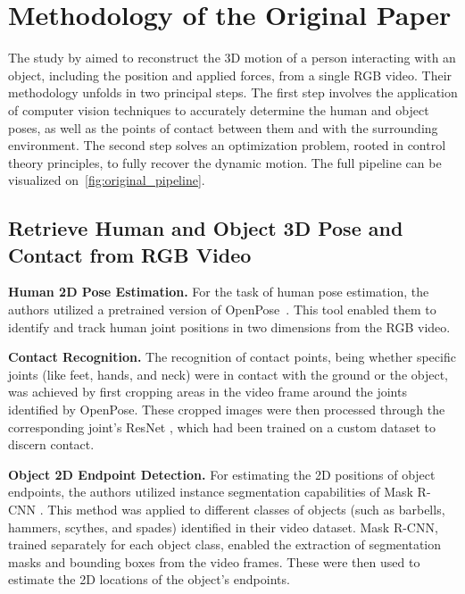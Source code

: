 \section{Methodology of the Original Paper}
\label{sec:methodo_paper}

The study by \citet{li2019estimating} aimed to reconstruct the 3D motion of a person interacting with an object, including the position 
and applied forces, from a single RGB video. Their methodology unfolds in two principal steps. The first step involves the application of 
computer vision techniques to accurately determine the human and object poses, as well as the points of contact between them and with the 
surrounding environment. The second step solves an optimization problem, rooted in control theory principles, to fully recover 
the dynamic motion. The full pipeline can be visualized on~\cref{fig:original_pipeline}.

\begin{figure*}
    \centering
    \fbox{\rule{0pt}{2in} \rule{.9\linewidth}{0pt}}
    \caption{Full original pipeline.}
    \label{fig:original_pipeline}
\end{figure*}


\subsection{Retrieve Human and Object 3D Pose and Contact from RGB Video}
\label{subsec:retrieve_original}

\noindent\textbf{Human 2D Pose Estimation.}\label{2dpose} For the task of human pose estimation, the authors utilized a pretrained version of 
OpenPose~\cite{cao2017realtime}. This tool enabled them to identify and track human joint positions in two dimensions from the RGB video.

\noindent\textbf{Contact Recognition.} The recognition of contact points, being whether specific joints (like feet, hands, and neck) were in 
contact with the ground or the object, was achieved by first cropping areas in the video frame around the joints identified by OpenPose. 
These cropped images were then processed through the corresponding joint's ResNet \cite{he2016deep}, which had been trained on a custom dataset 
to discern contact.

\noindent\textbf{Object 2D Endpoint Detection.} For estimating the 2D positions of object endpoints, the authors utilized instance segmentation 
capabilities of Mask R-CNN \cite{he2017mask}. This method was applied to different classes of objects (such as barbells, hammers, scythes, 
and spades) identified in their video dataset. Mask R-CNN, trained separately for each object class, enabled the extraction of segmentation masks
and bounding boxes from the video frames. These were then used to estimate the 2D locations of the object's endpoints.

